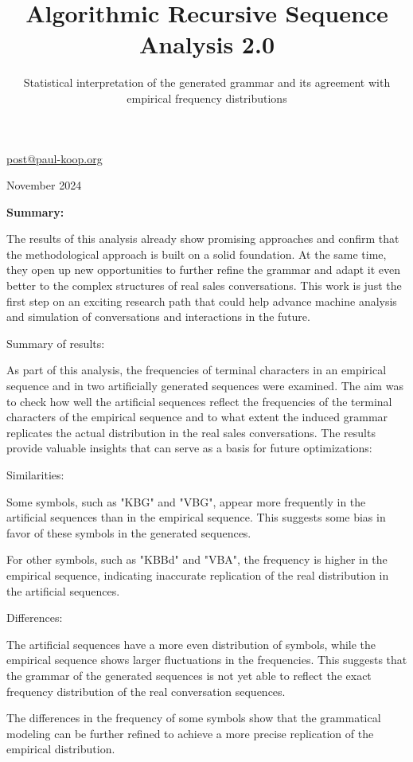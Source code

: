\documentclass[
]{article}
\title{\protect\phantomsection\label{_stdyajrcip3u}{}Algorithmic
Recursive Sequence Analysis 2.0}
\subtitle{\protect\phantomsection\label{_wargoqm4vfzj}{}Statistical
interpretation of the generated grammar and its agreement with empirical
frequency distributions}
\author{}
\date{}
\begin{document}
\maketitle

\href{mailto:post@paul-koop.org}{\ul{post@paul-koop.org}}

November 2024

\textbf{Summary:}

The results of this analysis already show promising approaches and
confirm that the methodological approach is built on a solid foundation.
At the same time, they open up new opportunities to further refine the
grammar and adapt it even better to the complex structures of real sales
conversations. This work is just the first step on an exciting research
path that could help advance machine analysis and simulation of
conversations and interactions in the future.

Summary of results:

As part of this analysis, the frequencies of terminal characters in an
empirical sequence and in two artificially generated sequences were
examined. The aim was to check how well the artificial sequences reflect
the frequencies of the terminal characters of the empirical sequence and
to what extent the induced grammar replicates the actual distribution in
the real sales conversations. The results provide valuable insights that
can serve as a basis for future optimizations:

Similarities:

Some symbols, such as "KBG" and "VBG", appear more frequently in the
artificial sequences than in the empirical sequence. This suggests some
bias in favor of these symbols in the generated sequences.

For other symbols, such as "KBBd" and "VBA", the frequency is higher in
the empirical sequence, indicating inaccurate replication of the real
distribution in the artificial sequences.

Differences:

The artificial sequences have a more even distribution of symbols, while
the empirical sequence shows larger fluctuations in the frequencies.
This suggests that the grammar of the generated sequences is not yet
able to reflect the exact frequency distribution of the real
conversation sequences.

The differences in the frequency of some symbols show that the
grammatical modeling can be further refined to achieve a more precise
replication of the empirical distribution.
\end{document}
